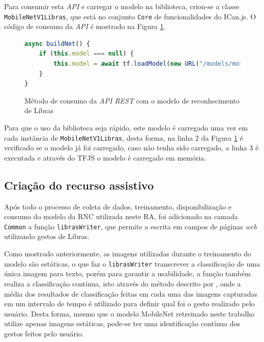 \par Para consumir esta \textit{API} e carregar o modelo na biblioteca, criou-se a classe \texttt{MobileNetV1Libras}, que está no conjunto \texttt{Core} de funcionalidades do ICan.js. O código de consumo da \textit{API} é mostrado na Figura \ref{figure:exemplo_consome_api}.

\begin{figure}[H]
    \centering
    \caption{Método de consumo da \textit{API REST} com o modelo de reconhecimento de Libras}
    \begin{lstlisting}[language=Javascript]
async buildNet() {
    if (this.model === null) {
        this.model = await tf.loadModel(new URL("/models/mobilenetv1/model.json", MODEL_URL).href);
    }
}
    \end{lstlisting}
    \label{figure:exemplo_consome_api}
\end{figure}

\par Para que o uso da biblioteca seja rápido, este modelo é carregado uma vez em cada instância de \texttt{MobileNetV1Libras}, desta forma, na linha 2 da Figura \ref{figure:exemplo_consome_api} é verificado se o modelo já foi carregado, caso não tenha sido carregado, a linha 3 é executada e através do TFJS o modelo é carregado em memória.

\subsection{Criação do recurso assistivo}

\par Após todo o processo de coleta de dados, treinamento, disponibilização e consumo do modelo da RNC utilizada neste RA, foi adicionado na camada \texttt{Common} a função \texttt{librasWriter}, que permite a escrita em campos de páginas \textit{web} utilizando gestos de Libras.

\par Como mostrado anteriormente, as imagens utilizadas durante o treinamento do modelo são estáticas, o que faz o \texttt{librasWriter} transcrever a classificação de uma única imagem para texto, porém para garantir a usabilidade, a função também realiza a classificação contínua, isto através do método descrito por , onde a média dos resultados de classificação feitas em cada uma das imagens capturadas em um intervalo de tempo é utilizado para definir qual foi o gesto realizado pelo usuário. Desta forma, mesmo que o modelo MobileNet retreinado neste trabalho utilize apenas imagens estáticas, pode-se ter uma identificação contínua dos gestos feitos pelo usuário.

